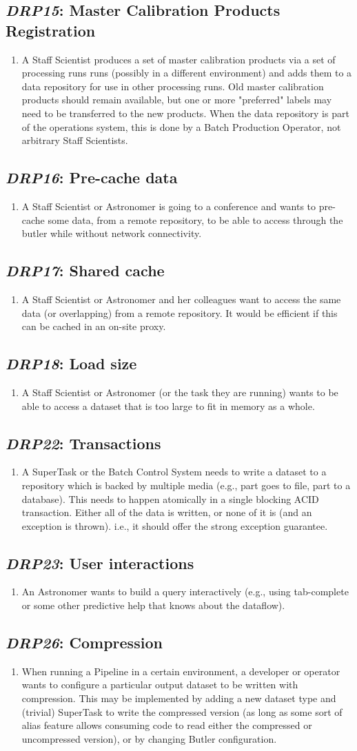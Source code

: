 \documentclass[DM,toc,lsstdraft]{lsstdoc}
\newcommand{\usecase}[3]{%
\subsection{\emph{#1}: #2}
\label{use:#1}
\begin{enumerate}[label=\alph*.]
#3
\end{enumerate}
}
\begin{document}
\usecase{DRP15}{Master Calibration Products Registration}{%

\item
A Staff Scientist produces a set of master calibration products via a set of processing runs runs (possibly in a different environment) and adds them to a data repository for use in other processing runs.
Old master calibration products should remain available, but one or more "preferred" labels may need to be transferred to the new products.
When the data repository is part of the operations system, this is done by a Batch Production Operator, not arbitrary Staff Scientists.
}

\usecase{DRP16}{Pre-cache data}{%

\item
A Staff Scientist or Astronomer is going to a conference and wants to pre-cache some data, from a remote repository, to be able to access through the butler while without network connectivity.
}

\usecase{DRP17}{Shared cache}{%

\item
A Staff Scientist or Astronomer and her colleagues want to access the same data (or overlapping) from a remote repository. It would be efficient if this can be cached in an on-site proxy.
}

\usecase{DRP18}{Load size}{%

\item
A Staff Scientist or Astronomer (or the task they are running) wants to be able to access a dataset that is too large to fit in memory as a whole.
}

\usecase{DRP22}{Transactions}{%

\item
A SuperTask or the Batch Control System needs to write a dataset to a repository which is backed by multiple media (e.g., part goes to file, part to a database).
This needs to happen atomically in a single blocking ACID transaction.
Either all of the data is written, or none of it is (and an exception is thrown).
i.e., it should offer the strong exception guarantee.
}

\usecase{DRP23}{User interactions}{%

\item
An Astronomer wants to build a query interactively (e.g., using tab-complete or some other predictive help that knows about the dataflow).
}

\usecase{DRP26}{Compression}{%

\item
When running a Pipeline in a certain environment, a developer or operator wants to configure a particular output dataset to be written with compression.
This may be implemented by adding a new dataset type and (trivial) SuperTask to write the compressed version (as long as some sort of alias feature allows consuming code to read either the compressed or uncompressed version), or by changing Butler configuration.
}
\end{document}

